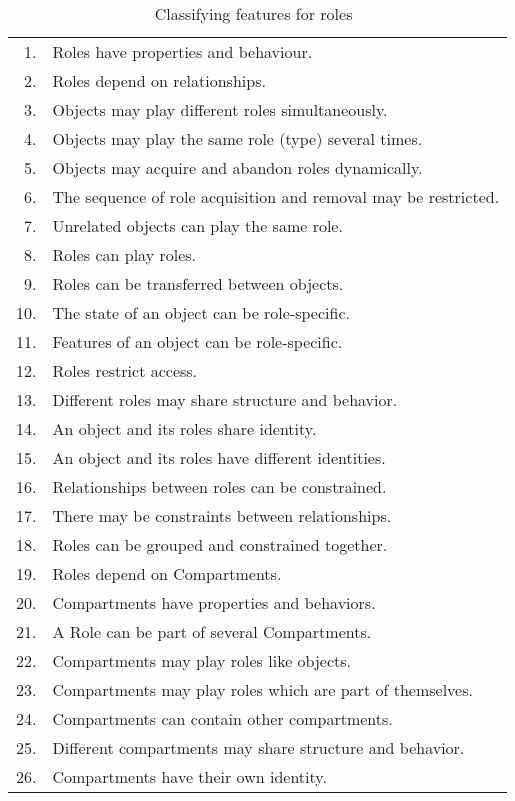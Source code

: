 \begin{table}[t]
  \caption{Classifying features for roles~\cite{Stei-DKE00,KuLG-SLE14}}
  \small
  \renewcommand\baselinestretch{0.99}\selectfont
  \centering
  \begin{tabularx}{0.8\linewidth}{rX} 
    \toprule
    1.  & Roles have properties and behaviour.\\
    2.  & Roles depend on relationships.\\
    3.  & Objects may play different roles simultaneously.\\
    4.  & Objects may play the same role (type) several times.\\
    5.  & Objects may acquire and abandon roles dynamically.\\
    6.  & The sequence of role acquisition and removal may be restricted.\\
    7.  & Unrelated objects can play the same role.\\
    8.  & Roles can play roles.\\
    9.  & Roles can be transferred between objects.\\
    10. & The state of an object can be role-specific.\\
    11. & Features of an object can be role-specific.\\
    12. & Roles restrict access.\\
    13. & Different roles may share structure and behavior.\\
    14. & An object and its roles share identity.\\
    15. & An object and its roles have different identities.\\
    \midrule
    16. & Relationships between roles can be constrained.\\
    17. & There may be constraints between relationships.\\
    18. & Roles can be grouped and constrained together.\\
    19. & Roles depend on Compartments.\\
    20. & Compartments have properties and behaviors.\\
    21. & A Role can be part of several Compartments.\\
    22. & Compartments may play roles like objects.\\
    23. & Compartments may play roles which are part of themselves.\\
    24. & Compartments can contain other compartments.\\
    25. & Different compartments may share structure and behavior.\\
    26. & Compartments have their own identity.\\
    \bottomrule
  \end{tabularx}
  \label{tab:role-features}
\end{table}


